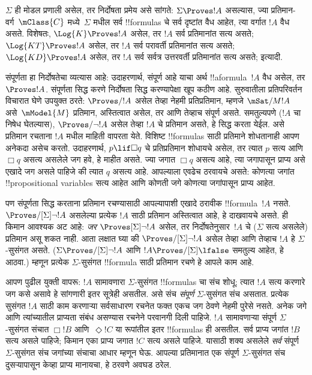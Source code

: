 \documentclass[../../../include/open-logic-section]{subfiles}
\begin{document}


$\Sigma$ ही मोडल प्रणाली असेल, तर निर्दोषता
प्रमेय असे सांगते: $\Sigma \Proves !A$ असल्यास,
ज्या प्रतिमान-वर्ग~$\mClass{C}$ मध्ये~$\Sigma$
मधील सर्व !!{formula}s चे सर्व दृष्टांत वैध
आहेत, त्या वर्गात $!A$ वैध असते.
विशेषतः, $\Log{K}
\Proves !A$ असेल, तर $!A$ सर्व प्रतिमानांत
सत्य असते; $\Log{KT} \Proves !A$ असेल,
तर $!A$ सर्व परावर्ती प्रतिमानांत सत्य असते;
$\Log{KD} \Proves !A$ असेल, तर $!A$
सर्व सर्वत्र उत्तरवर्ती प्रतिमानांत सत्य असते; इत्यादी.

संपूर्णता हा निर्दोषतेचा व्यत्यास आहे:
उदाहरणार्थ,  संपूर्ण आहे याचा अर्थ
!!a{formula}~$!A$ वैध असेल, तर $\Proves !A$.
संपूर्णता सिद्ध करणे निर्दोषता सिद्ध करण्यापेक्षा
खूप कठीण आहे. सुरुवातीला प्रतिपरिवर्तन विचारात
घेणे उपयुक्त ठरते: $\Proves/ !A$ असेल तेव्हा
नेहमी प्रतिप्रतिमान, म्हणजे
$\mSat/{M}{!A}$ असे~$\mModel{M}$ प्रतिमान,
अस्तित्वात असेल, तर आणि तेव्हाच 
संपूर्ण असते. समतुल्यपणे ($!A$ चा निषेध
घेतल्यास), $\Proves/ \lnot !A$ असेल तेव्हा
$!A$ चे प्रतिमान असते, हे सिद्ध करता येईल.
असे प्रतिमान रचताना $!A$ मधील माहिती
वापरता येते. विशिष्ट !!{formula}s साठी
प्रतिमाने शोधतानाही आपण अनेकदा असेच करतो.
उदाहरणार्थ, $p \lif \Box q$ चे प्रतिप्रतिमान
शोधायचे असेल, तर त्यात $p$ सत्य आणि
$\Box q$ असत्य असलेले जग हवे, हे माहीत असते.
ज्या जगात $\Box q$ असत्य आहे, त्या जगापासून
प्राप्य असे एखादे जग असले पाहिजे की त्यात $q$
असत्य आहे. आपल्याला एवढेच ठरवायचे असते:
कोणत्या जगांत !!{propositional variable}s
सत्य आहेत आणि कोणती जगे कोणत्या जगांपासून
प्राप्य आहेत.

पण संपूर्णता सिद्ध करताना प्रतिमान रचण्यासाठी
आपल्यापाशी एखादे ठरावीक !!{formula}~$!A$
नसते. $\Proves/[\Sigma] \lnot !A$ असलेल्या
प्रत्येक $!A$ साठी प्रतिमान अस्तित्वात आहे,
हे दाखवायचे असते. ही किमान आवश्यक अट आहे:
\emph{जर} $\Proves[\Sigma] \lnot !A$ असेल,
तर निर्दोषतेनुसार~$!A$ चे
($\Sigma$ सत्य असलेले) प्रतिमान असू शकत नाही.
आता लक्षात घ्या की $\Proves/[\Sigma]
\lnot !A$ असेल तेव्हा आणि तेव्हाच $!A$ हे
$\Sigma$-सुसंगत असते. ($\Sigma
\Proves/[\Sigma] \lnot !A$ आणि
$!A \Proves/[\Sigma] \lfalse$ समतुल्य
आहेत, हे आठवा.) म्हणून प्रत्येक
$\Sigma$-सुसंगत !!{formula} साठी प्रतिमान
रचणे हे आपले काम आहे.

आपण पुढील युक्ती वापरू: $!A$ सामावणारा
$\Sigma$-सुसंगत !!{formula}s चा संच शोधू;
त्यात $!A$ सत्य करणारे जग कसे असावे
हे सांगणारी इतर सूत्रेही असतील. असे संच
\emph{संपूर्ण} $\Sigma$-सुसंगत संच असतात.
प्रत्येक सुसंगत $!A$ साठी काम करणाऱ्या सर्वसाधारण रचनेत
फक्त एकच जग ठेवणे नेहमी पुरेसे नसते. अनेक जगे आणि
त्यांच्यातील प्राप्यता संबंध असण्यास रचनेने परवानगी दिली पाहिजे. $!A$ सामावणाऱ्या
संपूर्ण $\Sigma$-सुसंगत संचात
$\Box !B$ आणि~$\Diamond !C$ या रूपांतील
इतर !!{formula}s ही असतील. सर्व प्राप्य
जगांत $!B$ सत्य असले पाहिजे; किमान एका
प्राप्य जगात $!C$ सत्य असले पाहिजे. यासाठी
शक्य असलेले \emph{सर्व} संपूर्ण
$\Sigma$-सुसंगत संच जगांच्या संचाचा
आधार म्हणून घेऊ. आपल्या प्रतिमानात एक
संपूर्ण $\Sigma$-सुसंगत संच दुसऱ्यापासून
केव्हा प्राप्य मानायचा, हे ठरवणे अवघड
ठरेल.
\end{document}
